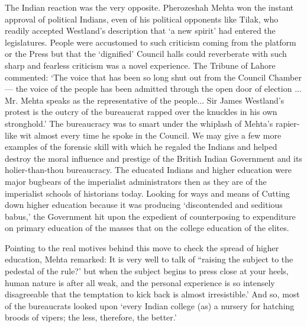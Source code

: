The Indian reaction was the very opposite. Pherozeshah Mehta won the instant approval of political Indians, even of his political opponents like Tilak, who readily accepted Westland's description that `a new spirit' had entered the legislatures. People were accustomed to such criticism coming from the platform or the Press but that the `dignified' Council halls could reverberate with such sharp and fearless criticism was a novel experience. The Tribune of Lahore commented: `The voice that has been so long shut out from the Council Chamber — the voice of the people has been admitted through the open door of election ... Mr. Mehta speaks as the representative of the people... Sir James Westland's protest is the outcry of the bureaucrat rapped over the knuckles in his own stronghold.' The bureaucracy was to smart under the whiplash of Mehta's rapier- like wit almost every time he spoke in the Council. We may give a few more examples of the forensic skill with which he regaled the Indians and helped destroy the moral influence and prestige of the British Indian Government and its holier-than-thou bureaucracy. The educated Indians and higher education were major bugbears of the imperialist administrators then as they are of the imperialist schools of historians today. Looking for ways and means of Cutting down higher education because it was producing `discontended and seditious babus,' the Government hit upon the expedient of counterposing to expenditure on primary education of the masses that on the college education of the elites.

Pointing to the real motives behind this move to check the spread of higher education, Mehta remarked: It is very well to talk of ``raising the subject to the pedestal of the rule?' but when the subject begins to press close at your heels, human nature is after all weak, and the personal experience is so intensely disagreeable that the temptation to kick back is almost irresistible.' And so, most of the bureaucrats looked upon `every Indian college (as) a nursery for hatching broods of vipers; the less, therefore, the better.'

